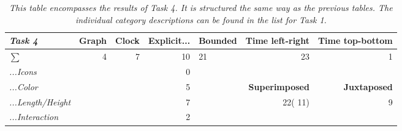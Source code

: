 \begin{table}[h]
	\centering
	\begin{tabular}{l|rr|r|lrr}
		\cline{2-7}
		\textit{\textbf{Task 4}} & \multicolumn{1}{l|}{\textbf{Graph}} & \multicolumn{1}{l|}{\textbf{Clock}} & \multicolumn{1}{l|}{\textbf{Explicit...}} & \multicolumn{1}{l|}{\textbf{Bounded}} & \multicolumn{1}{l|}{\textbf{Time left-right}} & \multicolumn{1}{l|}{\textbf{Time top-bottom}} \\ \hline
		\multicolumn{1}{|l|}{\textit{$\sum$}} & \multicolumn{1}{r|}{4} & 7 & 10 & \multicolumn{1}{l|}{21} & \multicolumn{1}{r|}{23} & \multicolumn{1}{r|}{1} \\ \hline
		\multicolumn{1}{|l|}{\textit{...Icons}} &  &  & 0 &  &  &  \\ \cline{1-1} \cline{4-4} \cline{6-7} 
		\multicolumn{1}{|l|}{\textit{...Color}} &  &  & 5 & \multicolumn{1}{l|}{} & \multicolumn{1}{r|}{\textbf{Superimposed}} & \multicolumn{1}{r|}{\textbf{Juxtaposed}} \\ \cline{1-1} \cline{4-4} \cline{6-7} 
		\multicolumn{1}{|l|}{\textit{...Length/Height}} &  &  & 7 & \multicolumn{1}{l|}{} & \multicolumn{1}{r|}{22({\color[HTML]{CB0000}  11})} & \multicolumn{1}{r|}{9} \\ \cline{1-1} \cline{4-4} \cline{6-7} 
		\multicolumn{1}{|l|}{\textit{...Interaction}} &  &  & 2 & \textit{} &  &  \\ \cline{1-1} \cline{4-4}
	\end{tabular}
\caption{\textit{This table encompasses the results of Task 4. It is structured the same way as the previous tables. The individual category descriptions can be found in the list for Task 1.}}
\label{tb:t4}
\end{table}